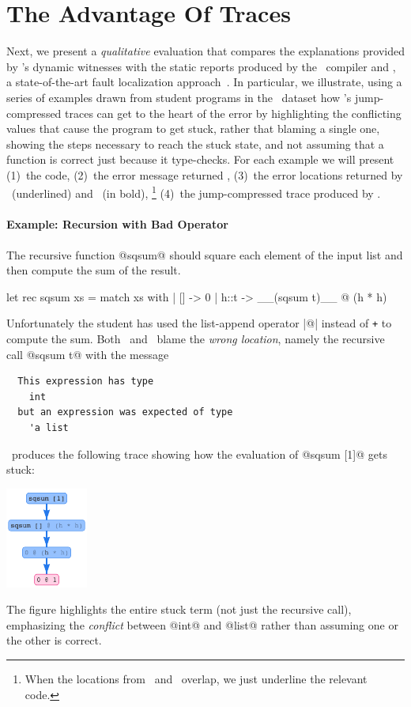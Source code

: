 \section{The Advantage Of Traces}\label{sec:advantage-traces}

Next, we present a \emph{qualitative} evaluation that compares
the explanations provided by \toolname's dynamic witnesses with
the static reports produced by the \ocaml\ compiler and \sherrloc,
a state-of-the-art fault localization approach~\cite{zhang_toward_2014}.
%
In particular, we illustrate, using a series of examples drawn
from student programs in the \ucsdbench\ dataset how \toolname's
jump-compressed traces can get to the heart of the error by
%
highlighting the conflicting values that cause the program to get
stuck, rather that blaming a single one,
%
showing the steps necessary to reach the stuck state, and
%
not assuming that a function is correct just because it type-checks.
%
For each example we will present
(1)~the code,
(2)~the error message returned \ocaml,
(3)~the error locations returned by \ocaml\ (underlined) and \sherrloc\ (in bold),
\footnote{When the locations from \ocaml\ and \sherrloc\ overlap,
we just underline the relevant code.}
(4)~the jump-compressed trace produced by \toolname.



\paragraph{Example: Recursion with Bad Operator}
The recursive function @sqsum@ should square each
element of the input list and then compute the sum
of the result.
%
\begin{ecode}
  let rec sqsum xs = match xs with
    | [] -> 0
    | h::t -> __(sqsum t)__ @ (h * h)
\end{ecode}
%
Unfortunately the student has used the list-append
operator |@| instead of \texttt{+} to compute the sum.
%
Both \ocaml\ and \sherrloc\ blame the \emph{wrong location},
namely the recursive call @sqsum t@ with the message
%
\begin{verbatim}
  This expression has type
    int
  but an expression was expected of type
    'a list
\end{verbatim}
%
\toolname\ produces the following trace showing how the evaluation of
@sqsum [1]@ gets stuck:
%
\begin{center}
  \includegraphics[height=125px]{sqsum.png}
\end{center}
%
The figure highlights the entire stuck term
(not just the recursive call), emphasizing
the \emph{conflict} between @int@ and @list@
rather than assuming one or the other is correct.

